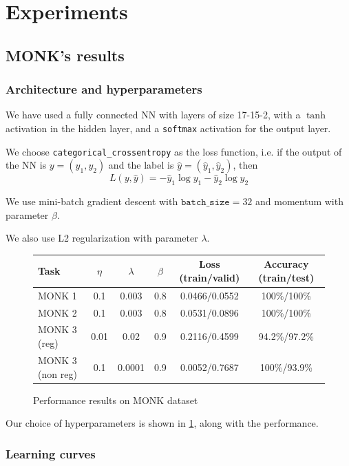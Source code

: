 \section{Experiments}

\subsection{MONK's results}

\subsubsection{Architecture and hyperparameters}
We have used a fully connected NN with layers of size 17-15-2, with a $\tanh$ activation in the hidden layer, and a \texttt{softmax} activation for the output layer.

We choose \texttt{categorical\_crossentropy} as the loss function, i.e. if the output of the NN is $y=(y_1,y_2)$ and the label is $\hat y=(\hat y_1,\hat y_2)$, then $$L(y,\hat y)=-\hat y_1\log y_1-\hat y_2\log y_2$$

We use mini-batch gradient descent with $\texttt{batch\_size}=32$ and momentum with parameter $\beta$.

We also use L2 regularization with parameter $\lambda$.

\begin{figure}
    \caption{Performance results on MONK dataset}
    \label{fig:hyper}
    \begin{tabular}{|l|c|c|c|c|c|}
        \hline 
        Task & $\eta$ & $\lambda$ & $\beta$ & Loss (train/valid) & Accuracy (train/test) \\ \hline
        MONK 1 & 0.1 & 0.003 & 0.8 & 0.0466/0.0552  & 100\%/100\% \\ \hline
        MONK 2 & 0.1 & 0.003 & 0.8 & 0.0531/0.0896 & 100\%/100\% \\ \hline
        MONK 3 (reg) & 0.01 & 0.02 & 0.9 & 0.2116/0.4599 & 94.2\%/97.2\% \\ \hline
        MONK 3 (non reg) & 0.1 & 0.0001 & 0.9 & 0.0052/0.7687 & 100\%/93.9\% \\ \hline
    \end{tabular}
\end{figure}

Our choice of hyperparameters is shown in \cref{fig:hyper}, along with the performance.


\subsubsection{Learning curves}

